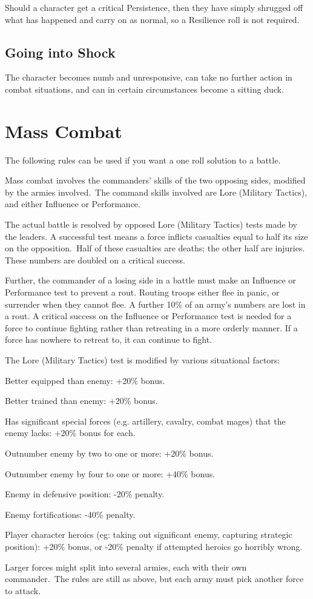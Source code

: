 Should a character get a critical Persistence, then they have simply shrugged off what has happened and carry on as normal, so a Resilience roll is not required. 


\subsection{Going into Shock}
The character becomes numb and unresponsive, can take no further action in combat situations, and can in certain circumstances become a sitting duck. 


\section{Mass Combat}
The following rules can be used if you want a one roll solution to a battle.

Mass combat involves the commanders’ skills of the two opposing sides, modified by the armies involved. The command skills involved are Lore (Military Tactics), and either Influence or Performance.

The actual battle is resolved by opposed Lore (Military Tactics) tests made by the leaders. A successful test means a force inflicts casualties equal to half its size on the opposition. Half of these casualties are deaths; the other half are injuries. These numbers are doubled on a critical success.

Further, the commander of a losing side in a battle must make an Influence or Performance test to prevent a rout. Routing troops either flee in panic, or surrender when they cannot flee. A further 10\% of an army’s numbers are lost in a rout. A critical success on the Influence or Performance test is needed for a force to continue fighting rather than retreating in a more orderly manner. If a force has nowhere to retreat to, it can continue to fight.

The Lore (Military Tactics) test is modified by various situational factors:
\begin{rpg-list}
\item Better equipped than enemy: +20\% bonus.
\item Better trained than enemy: +20\% bonus.
\item Has significant special forces (e.g. artillery, cavalry, combat mages) that the enemy lacks: +20\% bonus for each.
\item Outnumber enemy by two to one or more: +20\% bonus.
\item Outnumber enemy by four to one or more: +40\% bonus.
\item Enemy in defensive position: -20\% penalty.
\item Enemy fortifications: -40\% penalty.
\item Player character heroics (eg: taking out significant enemy, capturing strategic position): +20\% bonus, or -20\% penalty if attempted heroics go horribly wrong.
\end{rpg-list}

Larger forces might split into several armies, each with their own commander. The rules are still as above, but each army must pick another force to attack.

